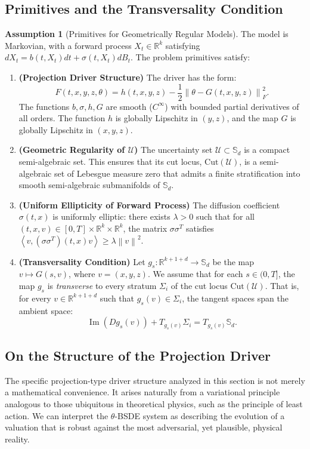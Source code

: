 \documentclass[12pt, letterpaper]{amsart}
\newcommand{\Ucal}{\mathcal{U}}
\DeclareMathOperator{\Image}{Im}
\newcommand{\Sd}{\mathbb{S}_d}
\newcommand{\R}{\mathbb{R}}
\newcommand{\norm}[1]{\left\lVert#1\right\rVert}
\newcommand{\scpr}[2]{\left\langle #1, #2 \right\rangle}
\theoremstyle{plain}
\theoremstyle{definition}
\newtheorem{assumption}[theorem]{Assumption}
\theoremstyle{remark}
\numberwithin{equation}{section} %
\begin{document}
\subsection{Primitives and the Transversality Condition}

\begin{assumption}[Primitives for Geometrically Regular Models]\label{ass:pathwise_consistency}
The model is Markovian, with a forward process $X_t \in \R^k$ satisfying $dX_t = b(t, X_t) dt + \sigma(t, X_t) dB_t$. The problem primitives satisfy:
\begin{enumerate}[label=(\roman*)]
    \item \textbf{(Projection Driver Structure)} The driver has the form:
    \[ F(t,x,y,z,\theta) = h(t,x,y,z) - \frac{1}{2}\norm{\theta - G(t,x,y,z)}_F^2. \]
    The functions $b, \sigma, h, G$ are smooth ($C^\infty$) with bounded partial derivatives of all orders. The function $h$ is globally Lipschitz in $(y,z)$, and the map $G$ is globally Lipschitz in $(x,y,z)$.

    \item \textbf{(Geometric Regularity of $\Ucal$)} The uncertainty set $\Ucal \subset \Sd$ is a compact semi-algebraic set. This ensures that its cut locus, $\mathrm{Cut}(\Ucal)$, is a semi-algebraic set of Lebesgue measure zero that admits a finite stratification into smooth semi-algebraic submanifolds of $\Sd$.
    
    \item \textbf{(Uniform Ellipticity of Forward Process)} The diffusion coefficient $\sigma(t,x)$ is uniformly elliptic: there exists $\lambda > 0$ such that for all $(t,x,v) \in [0,T]\times\R^k\times\R^k$, the matrix $\sigma\sigma^T$ satisfies $\scpr{v}{(\sigma\sigma^T)(t,x)v} \ge \lambda \norm{v}^2$.

    \item \textbf{(Transversality Condition)} Let $g_s: \R^{k+1+d} \to \Sd$ be the map $v \mapsto G(s,v)$, where $v=(x,y,z)$. We assume that for each $s \in (0,T]$, the map $g_s$ is \emph{transverse} to every stratum $\Sigma_i$ of the cut locus $\mathrm{Cut}(\Ucal)$. That is, for every $v \in \R^{k+1+d}$ such that $g_s(v) \in \Sigma_i$, the tangent spaces span the ambient space:
    \[ \Image(D g_s(v)) + T_{g_s(v)}\Sigma_i = T_{g_s(v)}\Sd. \]
\end{enumerate}
\end{assumption}


\subsection{On the Structure of the Projection Driver}
The specific projection-type driver structure analyzed in this section is not merely a mathematical convenience. It arises naturally from a variational principle analogous to those ubiquitous in theoretical physics, such as the principle of least action. We can interpret the \(\theta\)-BSDE system as describing the evolution of a valuation that is robust against the most adversarial, yet plausible, physical reality.
\end{document}
